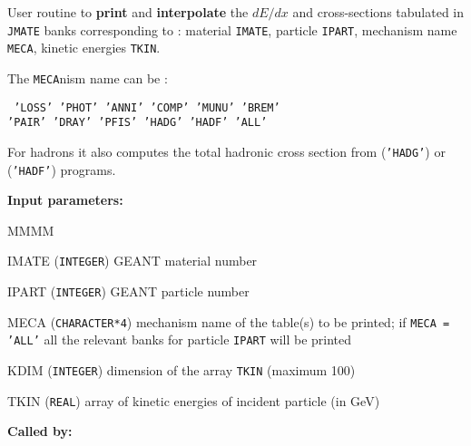      
    
 
User routine to
{\bf print} and {\bf interpolate} the $dE/dx$ and cross-sections
tabulated in {\tt JMATE} banks corresponding to :
material {\tt IMATE}, particle {\tt IPART}, mechanism name {\tt MECA},
kinetic energies {\tt TKIN}.
 
The {\tt MECA}nism name can be :
\begin{center}
{\tt
'LOSS' 'PHOT' 'ANNI' 'COMP' 'MUNU' 'BREM'  \\
'PAIR' 'DRAY' 'PFIS' 'HADG' 'HADF' 'ALL'
}
\end{center}
For hadrons it also computes the total
hadronic cross section from   ({\tt'HADG'}) or
 ({\tt 'HADF'}) programs.
 
{\bf Input parameters:}
\begin{DL}{MMMM}
\item[IMATE]    ({\tt INTEGER})  GEANT material number
\item[IPART]   ({\tt INTEGER})  GEANT particle number
\item[MECA]    ({\tt CHARACTER*4}) mechanism name of the table(s) to be
printed; if {\tt MECA = 'ALL'}  all the relevant banks for particle
{\tt  IPART} will be printed
\item[KDIM]   ({\tt INTEGER}) dimension of the array {\tt TKIN}
(maximum 100)
\item[TKIN]   ({\tt REAL}) array of kinetic energies of incident particle
(in GeV)
\end{DL}
{\bf Called by:} 
%
 
